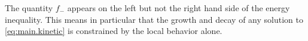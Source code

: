\begin{remark}
The quantity $f_-$ appears on the left but not the right hand side of the energy inequality.  This means in particular that the growth and decay of any solution to \eqref{eq:main.kinetic} is constrained by the local behavior alone.  
\end{remark}





